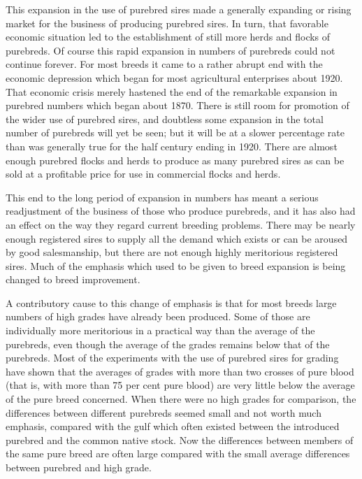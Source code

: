 This expansion in the use of purebred sires made a generally expanding or rising market for the business of producing 
purebred sires. In turn, that favorable economic situation led to the establishment of still more herds and flocks of 
purebreds. Of course this rapid expansion in numbers of purebreds could not continue forever. For most breeds it came to a 
rather abrupt end with the economic depression which began for most agricultural enterprises about 1920. That economic 
crisis merely hastened the end of the remarkable expansion in purebred numbers which began about 1870. There is still room 
for promotion of the wider use of purebred sires, and doubtless some expansion in the total number of purebreds will yet be 
seen; but it will be at a slower percentage rate than was generally true for the half century ending in 1920. There are 
almost enough purebred flocks and herds to produce as many purebred sires as can be sold at a profitable price for use in 
commercial flocks and herds.

This end to the long period of expansion in numbers has meant a serious readjustment of the business of those who produce 
purebreds, and it has also had an effect on the way they regard current breeding problems. There may be nearly enough 
registered sires to supply all the demand which exists or can be aroused by good salesmanship, but there are not enough 
highly meritorious registered sires. Much of the emphasis which used to be given to breed expansion is being changed to breed
improvement.

A contributory cause to this change of emphasis is that for most breeds large numbers of high grades have already been 
produced. Some of those are individually more meritorious in a practical way than the average of the purebreds, even though 
the average of the grades remains below that of the purebreds. Most of the experiments with the use of purebred sires for 
grading have shown that the averages of grades with more than two crosses of pure blood (that is, with more than 75 per
cent pure blood) are very little below the average of the pure breed concerned. When there were no high grades for 
comparison, the differences between different purebreds seemed small and not worth much emphasis, compared with the gulf 
which often existed between the introduced purebred and the common native stock. Now the differences between members of the 
same pure breed are often large compared with the small average differences between purebred and high grade.

